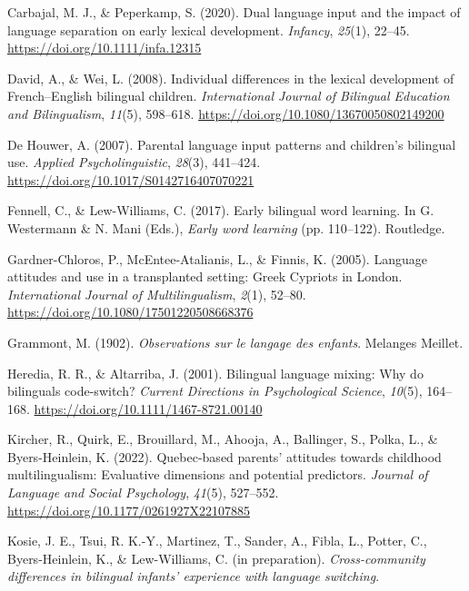 \documentclass[
  man,floatsintext]{apa7}
\newlength{\cslhangindent}
\newlength{\cslentryspacingunit} %
\newenvironment{CSLReferences}[2] %
 {%
  \setlength{\parindent}{0pt}
  \ifodd #1
  \let\oldpar\par
  \def\par{\hangindent=\cslhangindent\oldpar}
  \fi
  \setlength{\parskip}{#2\cslentryspacingunit}
 }%
 {}
\begin{document}
\begin{CSLReferences}{1}{0}
\leavevmode{}%
Carbajal, M. J., \& Peperkamp, S. (2020). Dual language input and the impact of language separation on early lexical development. \emph{Infancy}, \emph{25}(1), 22--45. \url{https://doi.org/10.1111/infa.12315}

\leavevmode{}%
David, A., \& Wei, L. (2008). Individual differences in the lexical development of {F}rench--{E}nglish bilingual children. \emph{International Journal of Bilingual Education and Bilingualism}, \emph{11}(5), 598--618. \url{https://doi.org/10.1080/13670050802149200}

\leavevmode{}%
De Houwer, A. (2007). Parental language input patterns and children's bilingual use. \emph{Applied Psycholinguistic}, \emph{28}(3), 441--424. \url{https://doi.org/10.1017/S0142716407070221}

\leavevmode{}%
Fennell, C., \& Lew-Williams, C. (2017). Early bilingual word learning. In G. Westermann \& N. Mani (Eds.), \emph{Early word learning} (pp. 110--122). Routledge.

\leavevmode{}%
Gardner-Chloros, P., McEntee-Atalianis, L., \& Finnis, K. (2005). Language attitudes and use in a transplanted setting: {Greek Cypriots} in {London}. \emph{International Journal of Multilingualism}, \emph{2}(1), 52--80. \url{https://doi.org/10.1080/17501220508668376}

\leavevmode{}%
Grammont, M. (1902). \emph{Observations sur le langage des enfants}. Melanges Meillet.

\leavevmode{}%
Heredia, R. R., \& Altarriba, J. (2001). Bilingual language mixing: Why do bilinguals code-switch? \emph{Current Directions in Psychological Science}, \emph{10}(5), 164--168. \url{https://doi.org/10.1111/1467-8721.00140}

\leavevmode{}%
Kircher, R., Quirk, E., Brouillard, M., Ahooja, A., Ballinger, S., Polka, L., \& Byers-Heinlein, K. (2022). Quebec-based parents' attitudes towards childhood multilingualism: Evaluative dimensions and potential predictors. \emph{Journal of Language and Social Psychology}, \emph{41}(5), 527--552. \url{https://doi.org/10.1177/0261927X22107885}

\leavevmode{}%
Kosie, J. E., Tsui, R. K.-Y., Martinez, T., Sander, A., Fibla, L., Potter, C., Byers-Heinlein, K., \& Lew-Williams, C. (in preparation). \emph{Cross-community differences in bilingual infants' experience with language switching}.


\end{CSLReferences}
\end{document}
